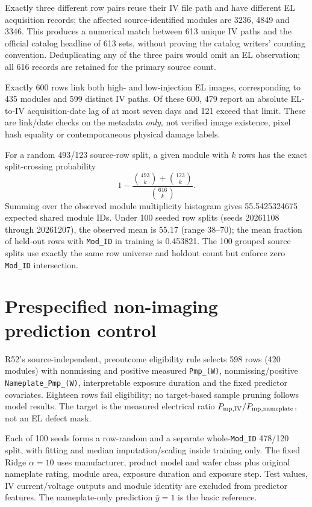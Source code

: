 \documentclass[10pt,a4paper]{article}
\begin{document}
Exactly three different row pairs reuse their IV file path and have different EL acquisition records; the affected source-identified modules are 3236, 4849 and 3346. This produces a numerical match between 613 unique IV paths and the official catalog headline of 613 sets, without proving the catalog writers' counting convention. Deduplicating any of the three pairs would omit an EL observation; all 616 records are retained for the primary source count.

Exactly 600 rows link both high- and low-injection EL images, corresponding to 435 modules and 599 distinct IV paths. Of these 600, 479 report an absolute EL-to-IV acquisition-date lag of at most seven days and 121 exceed that limit. These are link/date checks on the metadata \emph{only}, not verified image existence, pixel hash equality or contemporaneous physical damage labels.

For a random 493/123 source-row split, a given module with $k$ rows has the exact split-crossing probability
\begin{equation}
 1-\frac{\binom{493}{k}+\binom{123}{k}}{\binom{616}{k}}.
\end{equation}
Summing over the observed module multiplicity histogram gives 55.5425324675 expected shared module IDs. Under 100 seeded row splits (seeds 20261108 through 20261207), the observed mean is 55.17 (range 38--70); the mean fraction of held-out rows with \texttt{Mod\_ID} in training is 0.453821. The 100 grouped source splits use exactly the same row universe and holdout count but enforce zero \texttt{Mod\_ID} intersection.

\section{Prespecified non-imaging prediction control}
R52's source-independent, preoutcome eligibility rule selects 598 rows (420 modules) with nonmissing and positive measured \texttt{Pmp\_(W)}, nonmissing/positive \texttt{Nameplate\_Pmp\_(W)}, interpretable exposure duration and the fixed predictor covariates. Eighteen rows fail eligibility; no target-based sample pruning follows model results. The target is the measured electrical ratio $P_{\rm mp,IV}/P_{\rm mp,nameplate}$, not an EL defect mask.

Each of 100 seeds forms a row-random and a separate whole-\texttt{Mod\_ID} 478/120 split, with fitting and median imputation/scaling inside training only. The fixed Ridge $\alpha=10$ uses manufacturer, product model and wafer class plus original nameplate rating, module area, exposure duration and exposure step. Test values, IV current/voltage outputs and module identity are excluded from predictor features. The nameplate-only prediction $\hat y=1$ is the basic reference.
\end{document}
